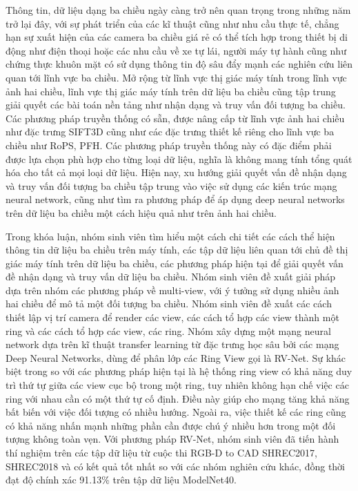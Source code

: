 \begin{EnAbstract}

Thông tin, dữ liệu dạng ba chiều ngày càng trở nên quan trọng trong những năm trở lại đây, với sự phát triển của các kĩ thuật cũng như nhu cầu thực tế, chẳng hạn sự xuất hiện của các camera ba chiều giá rẻ có thể tích hợp trong thiết bị di động như điện thoại hoặc các nhu cầu về xe tự lái, người máy tự hành cũng như chứng thực khuôn mặt có sử dụng thông tin độ sâu đẩy mạnh các nghiên cứu liên quan tới lĩnh vực ba chiều. Mở rộng từ lĩnh vực thị giác máy tính trong lĩnh vực ảnh hai chiều, lĩnh vực thị giác máy tính trên dữ liệu ba chiều cũng tập trung giải quyết các bài toán nền tảng như nhận dạng và truy vấn đối tượng ba chiều. Các phương pháp truyền thống có sẵn, được nâng cấp từ lĩnh vực ảnh hai chiều như đặc trưng SIFT3D cũng như các đặc trưng thiết kế riêng cho lĩnh vực ba chiều như RoPS, PFH. Các phương pháp truyền thống này có đặc điểm phải được lựa chọn phù hợp cho từng loại dữ liệu, nghĩa là không mang tính tổng quát hóa cho tất cả mọi loại dữ liệu. Hiện nay, xu hướng giải quyết vấn đề nhận dạng và truy vấn đối tượng ba chiều tập trung vào việc sử dụng các kiến trúc mạng neural network, cũng như tìm ra phương pháp để áp dụng deep neural networks trên dữ liệu ba chiều một cách hiệu quả như trên ảnh hai chiều.

Trong khóa luận, nhóm sinh viên tìm hiểu một cách chi tiết các cách thể hiện thông tin dữ liệu ba chiều trên máy tính, các tập dữ liệu liên quan tới chủ đề thị giác máy tính trên dữ liệu ba chiều, các phương pháp hiện tại để giải quyết vấn đề nhận dạng và truy vấn dữ liệu ba chiều. Nhóm sinh viên đề xuất giải pháp dựa trên nhóm các phương pháp về multi-view, với ý tưởng sử dụng nhiều ảnh hai chiều để mô tả một đối tượng ba chiều. Nhóm sinh viên đề xuất các cách thiết lập vị trí camera để render các view, các cách tổ hợp các view thành một ring và các cách tổ hợp các view, các ring. Nhóm xây dựng một mạng neural network dựa trên kĩ thuật transfer learning từ đặc trưng học sâu bởi các mạng Deep Neural Networks, dùng để phân lớp các Ring View gọi là RV-Net. Sự khác biệt trong so với các phương pháp hiện tại là hệ thống ring view có khả năng duy trì thứ tự giữa các view cục bộ trong một ring, tuy nhiên không hạn chế việc các ring với nhau cần có một thứ tự cố định. Điều này giúp cho mạng tăng khả năng bất biến với việc đối tượng có nhiều hướng. Ngoài ra, việc thiết kế các ring cũng có khả năng nhấn mạnh những phần cần được chú ý nhiều hơn trong một đối tượng không toàn vẹn. Với phương pháp RV-Net, nhóm sinh viên đã tiến hành thí nghiệm trên các tập dữ liệu từ cuộc thi RGB-D to CAD SHREC2017, SHREC2018 và có kết quả tốt nhất so với các nhóm nghiên cứu khác, đồng thời đạt độ chính xác 91.13\% trên tập dữ liệu ModelNet40.


\end{EnAbstract}
